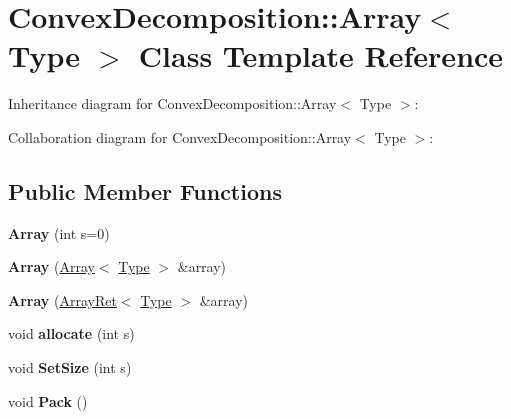 \hypertarget{class_convex_decomposition_1_1_array}{\section{Convex\+Decomposition\+:\+:Array$<$ Type $>$ Class Template Reference}
\label{class_convex_decomposition_1_1_array}
}


Inheritance diagram for Convex\+Decomposition\+:\+:Array$<$ Type $>$\+:


Collaboration diagram for Convex\+Decomposition\+:\+:Array$<$ Type $>$\+:
\subsection*{Public Member Functions}
\begin{DoxyCompactItemize}
\item 
\hypertarget{class_convex_decomposition_1_1_array_a1bec7f96b7d557b3035c5aa8c7ef5d03}{{\bfseries Array} (int s=0)}\label{class_convex_decomposition_1_1_array_a1bec7f96b7d557b3035c5aa8c7ef5d03}

\item 
\hypertarget{class_convex_decomposition_1_1_array_ac984f18597fe83d165faa7fd25a62031}{{\bfseries Array} (\hyperlink{class_convex_decomposition_1_1_array}{Array}$<$ \hyperlink{struct_type}{Type} $>$ \&array)}\label{class_convex_decomposition_1_1_array_ac984f18597fe83d165faa7fd25a62031}

\item 
\hypertarget{class_convex_decomposition_1_1_array_a52f0735609c370ae7feb3e94b0a60fca}{{\bfseries Array} (\hyperlink{singleton_convex_decomposition_1_1_array_ret}{Array\+Ret}$<$ \hyperlink{struct_type}{Type} $>$ \&array)}\label{class_convex_decomposition_1_1_array_a52f0735609c370ae7feb3e94b0a60fca}

\item 
\hypertarget{class_convex_decomposition_1_1_array_a603baca33126f6eaf633cb61780099e5}{void {\bfseries allocate} (int s)}\label{class_convex_decomposition_1_1_array_a603baca33126f6eaf633cb61780099e5}

\item 
\hypertarget{class_convex_decomposition_1_1_array_a547b415e3b324ecced51e541babcec69}{void {\bfseries Set\+Size} (int s)}\label{class_convex_decomposition_1_1_array_a547b415e3b324ecced51e541babcec69}

\item 
\hypertarget{class_convex_decomposition_1_1_array_a5d2e71c65df26b14a6d4776322357270}{void {\bfseries Pack} ()}\label{class_convex_decomposition_1_1_array_a5d2e71c65df26b14a6d4776322357270}


\end{DoxyCompactItemize}
